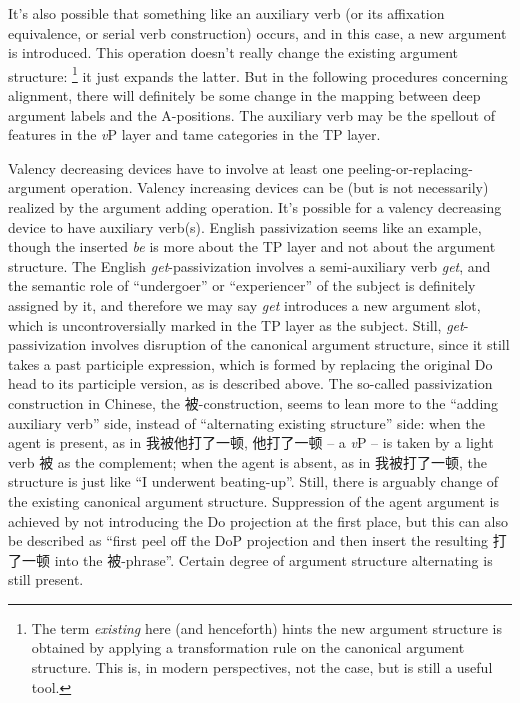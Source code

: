 \documentclass[UTF8, a4paper, oneside, scheme=plain]{ctexart}
\newcommand*{\term}[1]{\emph{#1}}
\newcommand*{\corpus}[1]{\emph{#1}}
\newcommand*{\vP}{\textit{v}P}
\begin{document}
It's also possible that something like an auxiliary verb 
(or its affixation equivalence, or serial verb construction) occurs,
and in this case, 
a new argument is introduced.
This operation doesn't really change the existing argument structure:%
\footnote{
    The term \term{existing} here (and henceforth) hints the new argument structure is obtained by
    applying a transformation rule on the canonical argument structure.
    This is, in modern perspectives, not the case,
    but is still a useful tool.
}
it just expands the latter.
But in the following procedures concerning alignment,
there will definitely be some change
in the mapping between deep argument labels and the A-positions.
The auxiliary verb may be the spellout of features in the \vP{} layer
and \ac{tame} categories in the TP layer.

Valency decreasing devices have to involve at least one peeling-or-replacing-argument operation.
Valency increasing devices can be (but is not necessarily) realized by the argument adding operation.
It's possible for a valency decreasing device to have auxiliary verb(s).
English passivization seems like an example,
though the inserted \corpus{be} is more about the TP layer
and not about the argument structure.
The English \corpus{get}-passivization involves 
a semi-auxiliary verb \corpus{get},
and the semantic role of ``undergoer'' or ``experiencer'' of the subject 
is definitely assigned by it,
and therefore we may say \corpus{get} introduces a new argument slot,
which is uncontroversially marked in the TP layer as the subject.
Still, \corpus{get}-passivization involves 
disruption of the canonical argument structure,
since it still takes a past participle expression,
which is formed by replacing the original Do head to its participle version,
as is described above.
The so-called passivization construction in Chinese,
the 被-construction,
seems to lean more to the ``adding auxiliary verb'' side,
instead of ``alternating existing structure'' side:
when the agent is present,
as in 我被他打了一顿, 
他打了一顿 -- a \vP{} -- is taken by a light verb 被 as the complement;
when the agent is absent,
as in 我被打了一顿,
the structure is just like ``I underwent beating-up''.
Still, there is arguably change of the existing canonical argument structure.
Suppression of the agent argument is achieved by not introducing the Do projection at the first place,
but this can also be described as 
``first peel off the DoP projection and then insert the resulting 打了一顿 into the 被-phrase''.
Certain degree of argument structure alternating is still present.
\end{document}
